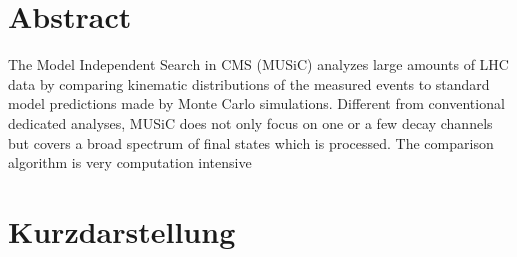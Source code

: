 \section*{Abstract}
The Model Independent Search in CMS (MUSiC) analyzes large amounts of LHC data by comparing kinematic distributions of the measured events to standard model predictions made by Monte Carlo simulations. Different from conventional dedicated analyses, MUSiC does not only focus on one or a few decay channels but covers a broad spectrum of final states which is processed. 
The comparison algorithm is very computation intensive

\section*{Kurzdarstellung}